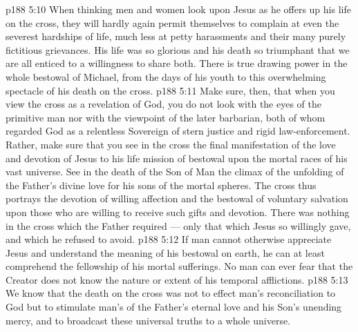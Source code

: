 \vs p188 5:10 When thinking men and women look upon Jesus as he offers up his life on the cross, they will hardly again permit themselves to complain at even the severest hardships of life, much less at petty harassments and their many purely fictitious grievances. His life was so glorious and his death so triumphant that we are all enticed to a willingness to share both. There is true drawing power in the whole bestowal of Michael, from the days of his youth to this overwhelming spectacle of his death on the cross.
\vs p188 5:11 Make sure, then, that when you view the cross as a revelation of God, you do not look with the eyes of the primitive man nor with the viewpoint of the later barbarian, both of whom regarded God as a relentless Sovereign of stern justice and rigid law\hyp{}enforcement. Rather, make sure that you see in the cross the final manifestation of the love and devotion of Jesus to his life mission of bestowal upon the mortal races of his vast universe. See in the death of the Son of Man the climax of the unfolding of the Father’s divine love for his sons of the mortal spheres. The cross thus portrays the devotion of willing affection and the bestowal of voluntary salvation upon those who are willing to receive such gifts and devotion. There was nothing in the cross which the Father required --- only that which Jesus so willingly gave, and which he refused to avoid.
\vs p188 5:12 \pc If man cannot otherwise appreciate Jesus and understand the meaning of his bestowal on earth, he can at least comprehend the fellowship of his mortal sufferings. No man can ever fear that the Creator does not know the nature or extent of his temporal afflictions.
\vs p188 5:13 We know that the death on the cross was not to effect man’s reconciliation to God but to stimulate man’s  of the Father’s eternal love and his Son’s unending mercy, and to broadcast these universal truths to a whole universe.
